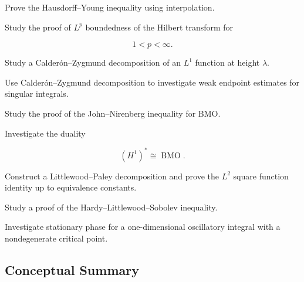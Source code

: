 \begin{exercise}[4]
Prove the Hausdorff--Young inequality using interpolation.
\end{exercise}

\begin{exercise}[4]
Study the proof of \(L^p\) boundedness of the Hilbert transform for

\[
1<p<\infty.
\]
\end{exercise}

\begin{exercise}[4]
Study a Calder\'on--Zygmund decomposition of an \(L^1\) function at height
\(\lambda\).
\end{exercise}

\begin{exercise}[4]
Use Calder\'on--Zygmund decomposition to investigate weak endpoint
estimates for singular integrals.
\end{exercise}

\begin{exercise}[4]
Study the proof of the John--Nirenberg inequality for BMO.
\end{exercise}

\begin{exercise}[4]
Investigate the duality

\[
(H^1)^*
\cong
\operatorname{BMO}.
\]
\end{exercise}

\begin{exercise}[4]
Construct a Littlewood--Paley decomposition and prove the \(L^2\) square
function identity up to equivalence constants.
\end{exercise}

\begin{exercise}[4]
Study a proof of the Hardy--Littlewood--Sobolev inequality.
\end{exercise}

\begin{exercise}[4]
Investigate stationary phase for a one-dimensional oscillatory integral
with a nondegenerate critical point.
\end{exercise}

\subsection{Conceptual Summary}
\label{subsec:harmonic-analysis-summary}


